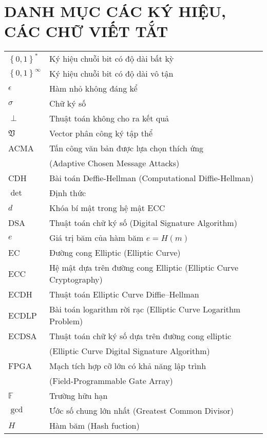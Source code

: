 \chapter*{DANH MỤC CÁC KÝ HIỆU, CÁC CHỮ VIẾT TẮT}
\begin{center}
\begin{tabular}{ l  l }
$\left\lbrace 0,1\right\rbrace^*$ & Ký hiệu chuỗi bit có độ dài bất kỳ \\
$\left\lbrace 0,1\right\rbrace^\infty$ & Ký hiệu chuỗi bit có độ dài vô tận \\
$\epsilon$ & Hàm nhỏ không đáng kể\\
$\sigma$ & Chữ ký số\\
$\perp$ & Thuật toán không cho ra kết quả\\
$\mathfrak{V}$ & Vector phân công ký tập thể\\
ACMA & Tấn công văn bản được lựa chọn thích ứng\\& (Adaptive Chosen Message Attacks) \\
CDH & Bài toán Deffie-Hellman (Computational Diffie-Hellman)\\
$\det$& Định thức\\
$d$ & Khóa bí mật trong hệ mật ECC\\
DSA & Thuật toán chữ ký số (Digital Signature Algorithm) \\
$e$ & Giá trị băm của hàm băm $e=H(m)$\\
EC & Đường cong Elliptic (Elliptic Curve) \\
ECC & Hệ mật dựa trên đường cong Elliptic (Elliptic Curve Cryptography) \\
ECDH & Thuật toán Elliptic Curve Diffie–Hellman \\
ECDLP & Bài toán logarithm rời rạc (Elliptic Curve Logarithm Problem) \\
ECDSA & Thuật toán chữ ký số dựa trên đường cong elliptic\\& (Elliptic Curve Digital Signature Algorithm)\\
FPGA & Mạch tích hợp cỡ lớn có khả năng lập trình \\& (Field-Programmable Gate Array)\\
$\mathbb {F}$ & Trường hữu hạn\\
$\gcd$ & Ước số chung lớn nhất (Greatest Common Divisor)\\
$H$ & Hàm băm (Hash fuction)\\
\end{tabular}
\end{center}

